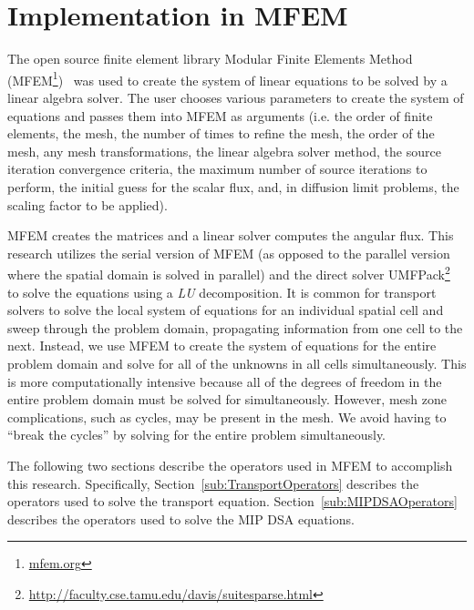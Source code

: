 \documentclass{article}
\begin{document}
\section{Implementation in MFEM}
The open source finite element library Modular Finite Elements Method (MFEM\footnote{\url{mfem.org}})~\cite{MFEM_Web} was used to create the system of linear equations to be solved by a linear algebra solver. The user chooses various parameters to create the system of equations and passes them into MFEM as arguments (i.e. the order of finite elements, the mesh, the number of times to refine the mesh, the order of the mesh, any mesh transformations, the linear algebra solver method, the source iteration convergence criteria, the maximum number of source iterations to perform, the initial guess for the scalar flux, and, in diffusion limit problems, the scaling factor to be applied).

MFEM creates the matrices and a linear solver computes the angular flux. This research utilizes the serial version of MFEM (as opposed to the parallel version where the spatial domain is solved in parallel) and the direct solver UMFPack\footnote{\url{http://faculty.cse.tamu.edu/davis/suitesparse.html}}~\cite{SuiteSparse,DavisUMFPack} to solve the equations using a \emph{LU} decomposition. It is common for transport solvers to solve the local system of equations for an individual spatial cell and sweep through the problem domain, propagating information from one cell to the next. Instead, we use MFEM to create the system of equations for the entire problem domain and solve for all of the unknowns in all cells simultaneously. This is more computationally intensive because all of the degrees of freedom in the entire problem domain must be solved for simultaneously. However, mesh zone complications, such as cycles, may be present in the mesh. We avoid having to ``break the cycles'' by solving for the entire problem simultaneously.

The following two sections describe the operators used in MFEM to accomplish this research. Specifically, Section~\ref{sub:TransportOperators} describes the operators used to solve the transport equation. Section~\ref{sub:MIPDSAOperators} describes the operators used to solve the MIP DSA equations.

\end{document}
